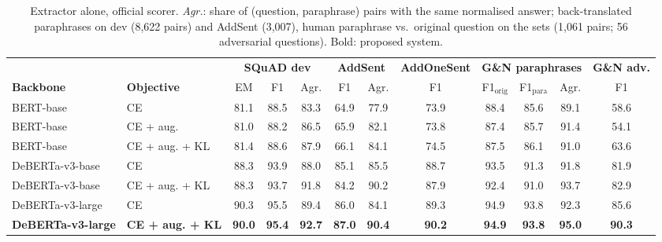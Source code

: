 \begin{table}[t]
\centering\small
\setlength{\tabcolsep}{3.2pt}
\begin{tabular}{llccc@{\hspace{8pt}}cc@{\hspace{8pt}}c@{\hspace{8pt}}ccc@{\hspace{8pt}}c}
\toprule
& & \multicolumn{3}{c}{\textbf{SQuAD dev}} & \multicolumn{2}{c}{\textbf{AddSent}} & \textbf{AddOneSent} & \multicolumn{3}{c}{\textbf{G\&N paraphrases}} & \textbf{G\&N adv.} \\
\cmidrule(lr){3-5} \cmidrule(lr){6-7} \cmidrule(lr){8-8} \cmidrule(lr){9-11} \cmidrule(lr){12-12}
\textbf{Backbone} & \textbf{Objective} & EM & F1 & Agr. & F1 & Agr. & F1 & F1$_{\mathrm{orig}}$ & F1$_{\mathrm{para}}$ & Agr. & F1 \\
\midrule
BERT-base & CE & 81.1 & 88.5 & 83.3 & 64.9 & 77.9 & 73.9 & 88.4 & 85.6 & 89.1 & 58.6 \\
BERT-base & CE + aug. & 81.0 & 88.2 & 86.5 & 65.9 & 82.1 & 73.8 & 87.4 & 85.7 & 91.4 & 54.1 \\
BERT-base & CE + aug. + KL & 81.4 & 88.6 & 87.9 & 66.1 & 84.1 & 74.5 & 87.5 & 86.1 & 91.0 & 63.6 \\
DeBERTa-v3-base & CE & 88.3 & 93.9 & 88.0 & 85.1 & 85.5 & 88.7 & 93.5 & 91.3 & 91.8 & 81.9 \\
DeBERTa-v3-base & CE + aug. + KL & 88.3 & 93.7 & 91.8 & 84.2 & 90.2 & 87.9 & 92.4 & 91.0 & 93.7 & 82.9 \\
DeBERTa-v3-large & CE & 90.3 & 95.5 & 89.4 & 86.0 & 84.1 & 89.3 & 94.9 & 93.8 & 92.3 & 85.6 \\
\textbf{DeBERTa-v3-large} & \textbf{CE + aug. + KL} & \textbf{90.0} & \textbf{95.4} & \textbf{92.7} & \textbf{87.0} & \textbf{90.4} & \textbf{90.2} & \textbf{94.9} & \textbf{93.8} & \textbf{95.0} & \textbf{90.3} \\
\bottomrule
\end{tabular}
\caption{Extractor alone, official scorer. \emph{Agr.}: share of (question, paraphrase) pairs with the same normalised answer; back-translated paraphrases on dev (8,622 pairs) and AddSent (3,007), human paraphrase vs.\ original question on the \citet{gan2019improving} sets (1,061 pairs; 56 adversarial questions). Bold: proposed system.}
\label{tab:main}
\end{table}
